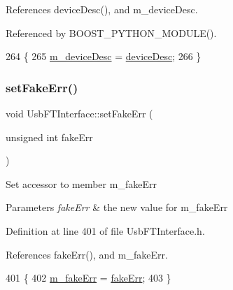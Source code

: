 References device\+Desc(), and m\+\_\+device\+Desc.



Referenced by B\+O\+O\+S\+T\+\_\+\+P\+Y\+T\+H\+O\+N\+\_\+\+M\+O\+D\+U\+L\+E().


\begin{DoxyCode}
264                                             \{
265     \hyperlink{classUsbFTInterface_a500067688c32cdb3719fecf128e88dca}{m\_deviceDesc} = \hyperlink{classUsbFTInterface_af353796fd68a869ea5c8e753aa65dc2c}{deviceDesc};
266   \}
\end{DoxyCode}
\mbox{\label{classUsbFTInterface_aec057577db0b913beedf1e9896498e10}} 
\subsubsection{\texorpdfstring{set\+Fake\+Err()}{setFakeErr()}}
{\footnotesize\ttfamily void Usb\+F\+T\+Interface\+::set\+Fake\+Err (\begin{DoxyParamCaption}\item[{unsigned int}]{fake\+Err }\end{DoxyParamCaption})\hspace{0.3cm}{\ttfamily [inline]}}

Set accessor to member m\+\_\+fake\+Err 
\begin{DoxyParams}{Parameters}
{\em fake\+Err} & the new value for m\+\_\+fake\+Err \\
\hline
\end{DoxyParams}


Definition at line 401 of file Usb\+F\+T\+Interface.\+h.



References fake\+Err(), and m\+\_\+fake\+Err.


\begin{DoxyCode}
401                                          \{
402     \hyperlink{classUsbFTInterface_ab3660cba031df164b2d2df6e4c40f291}{m\_fakeErr} = \hyperlink{classUsbFTInterface_abb29c7f73506259ef57d1e25204f8f7c}{fakeErr};
403   \}
\end{DoxyCode}
\mbox{\label{classUsbFTInterface_a6fb31500f8a6adbd3d6f84f7932844da}} 
